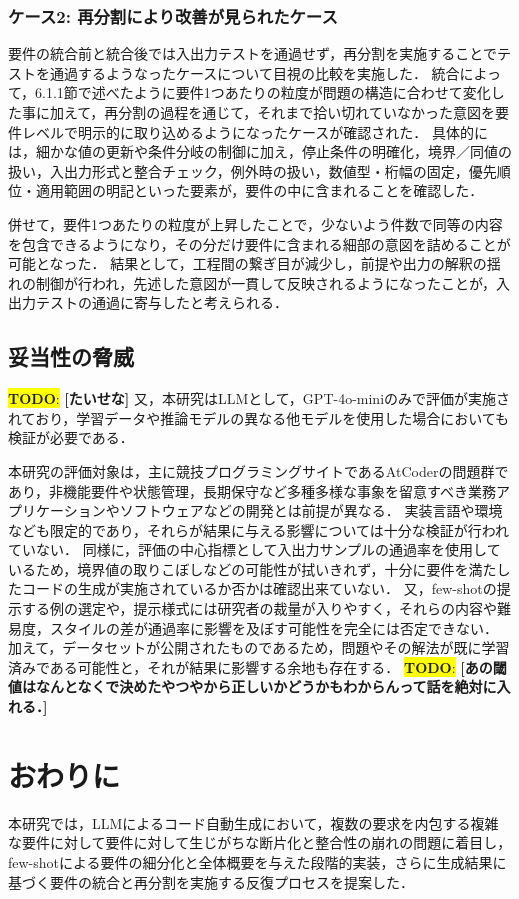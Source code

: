 \documentclass[submit,techrep,noauthor]{ipsj}
\newcommand{\todo}[1]{\colorbox{yellow}{{\bf TODO}:}{\color{red} {\textbf{[#1]}}}}
\begin{document}
\subsubsection{ケース2: 再分割により改善が見られたケース}
要件の統合前と統合後では入出力テストを通過せず，再分割を実施することでテストを通過するようなったケースについて目視の比較を実施した．
統合によって，6.1.1節で述べたように要件1つあたりの粒度が問題の構造に合わせて変化した事に加えて，再分割の過程を通じて，それまで拾い切れていなかった意図を要件レベルで明示的に取り込めるようになったケースが確認された．
具体的には，細かな値の更新や条件分岐の制御に加え，停止条件の明確化，境界／同値の扱い，入出力形式と整合チェック，例外時の扱い，数値型・桁幅の固定，優先順位・適用範囲の明記といった要素が，要件の中に含まれることを確認した．

併せて，要件1つあたりの粒度が上昇したことで，少ないよう件数で同等の内容を包含できるようになり，その分だけ要件に含まれる細部の意図を詰めることが可能となった．
結果として，工程間の繋ぎ目が減少し，前提や出力の解釈の揺れの制御が行われ，先述した意図が一貫して反映されるようになったことが，入出力テストの通過に寄与したと考えられる．


\subsection{妥当性の脅威}
\todo{たいせな}
又，本研究はLLMとして，GPT-4o-miniのみで評価が実施されており，学習データや推論モデルの異なる他モデルを使用した場合においても検証が必要である．

本研究の評価対象は，主に競技プログラミングサイトであるAtCoderの問題群であり，非機能要件や状態管理，長期保守など多種多様な事象を留意すべき業務アプリケーションやソフトウェアなどの開発とは前提が異なる．
実装言語や環境なども限定的であり，それらが結果に与える影響については十分な検証が行われていない．
同様に，評価の中心指標として入出力サンプルの通過率を使用しているため，境界値の取りこぼしなどの可能性が拭いきれず，十分に要件を満たしたコードの生成が実施されているか否かは確認出来ていない．
又，few-shotの提示する例の選定や，提示様式には研究者の裁量が入りやすく，それらの内容や難易度，スタイルの差が通過率に影響を及ぼす可能性を完全には否定できない．
加えて，データセットが公開されたものであるため，問題やその解法が既に学習済みである可能性と，それが結果に影響する余地も存在する．
\todo{あの閾値はなんとなくで決めたやつやから正しいかどうかもわからんって話を絶対に入れる．}

\section{おわりに}
\label{sec:conclusion}
本研究では，LLMによるコード自動生成において，複数の要求を内包する複雑な要件に対して要件に対して生じがちな断片化と整合性の崩れの問題に着目し，few-shotによる要件の細分化と全体概要を与えた段階的実装，さらに生成結果に基づく要件の統合と再分割を実施する反復プロセスを提案した．
\end{document}
